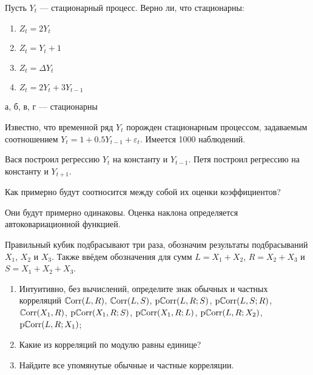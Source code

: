 
\begin{problem}
Пусть $Y_{t}$ — стационарный процесс. Верно ли, что стационарны:
\begin{enumerate}
\item $Z_{t}=2Y_{t}$
\item $Z_{t}=Y_{t}+1$
\item $Z_{t}=\Delta Y_{t}$
\item $Z_{t}=2Y_{t}+3Y_{t-1}$
\end{enumerate}
\begin{sol}
а, б, в, г — стационарны
\end{sol}
\end{problem}





\begin{problem}
Известно, что временной ряд $Y_{t}$ порожден стационарным процессом, задаваемым соотношением $Y_{t}=1+0.5Y_{t-1}+\varepsilon_{t}$. Имеется 1000 наблюдений.


Вася построил регрессию $Y_{t}$ на константу и $Y_{t-1}$. Петя построил регрессию на константу и $Y_{t+1}$.


Как примерно будут соотносится между собой их оценки коэффициентов?
\begin{sol}
Они будут примерно одинаковы. Оценка наклона определяется автоковариационной функцией.
\end{sol}
\end{problem}


\begin{problem}
Правильный кубик подбрасывают три раза, обозначим результаты подбрасываний $X_1$, $X_2$ и $X_3$. Также ввёдем обозначения для сумм $L=X_1+X_2$, $R=X_2+X_3$ и $S=X_1+X_2+X_3$.
\begin{enumerate}
\item Интуитивно, без вычислений, определите знак обычных и частных корреляций $\mathbb{C}\mathrm{orr}(L, R)$, $\mathbb{C}\mathrm{orr}(L, S)$, $\mathrm{p}\mathbb{C}\mathrm{orr}(L, R; S)$, 
  $\mathrm{p}\mathbb{C}\mathrm{orr}(L, S; R)$, $\mathbb{C}\mathrm{orr}(X_1, R)$, $\mathrm{p}\mathbb{C}\mathrm{orr}(X_1, R; S)$, $\mathrm{p}\mathbb{C}\mathrm{orr}(X_1, R; L)$, $\mathrm{p}\mathbb{C}\mathrm{orr}(L, R; X_2)$, $\mathrm{p}\mathbb{C}\mathrm{orr}(L, R; X_1)$;  
\item Какие из корреляций по модулю равны единице?
\item Найдите все упомянутые обычные и частные корреляции.
\end{enumerate}
\begin{sol}

\end{sol}
\end{problem}


